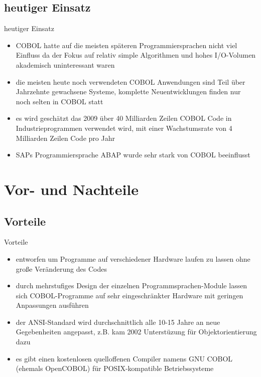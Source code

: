 \documentclass[handout]{beamer}
\begin{document}
\subsection{heutiger Einsatz}

\begin{frame}{heutiger Einsatz}
	\begin{itemize}
		\item
			COBOL hatte auf die meisten sp\"ateren Programmiersprachen nicht viel Einfluss da der Fokus auf relativ simple Algorithmen und hohes I/O-Volumen akademisch uninteressant waren
		\item
			die meisten heute noch verwendeten COBOL Anwendungen sind Teil \"uber Jahrzehnte gewachsene Systeme, komplette Neuentwicklungen finden nur noch selten in COBOL statt
		\item
			es wird gesch\"atzt das 2009 \"uber 40 Milliarden Zeilen COBOL Code in Industrieprogrammen verwendet wird, mit einer Wachstumsrate von 4 Milliarden Zeilen Code pro Jahr
		\item
			SAPs Programmiersprache ABAP wurde sehr stark von COBOL beeinflusst
	\end{itemize}
\end{frame}

\section{Vor- und Nachteile}

\subsection{Vorteile}

\begin{frame}{Vorteile}
	\begin{itemize}
		\item
			entworfen um Programme auf verschiedener Hardware laufen zu lassen ohne große Ver\"anderung des Codes
		\item
			durch mehrstufiges Design der einzelnen Programmsprachen-Module lassen sich COBOL-Programme auf sehr eingeschr\"ankter Hardware mit geringen Anpassungen ausf\"uhren
		\item
			der ANSI-Standard wird durchschnittlich alle 10-15 Jahre an neue Gegebenheiten angepasst, z.B. kam 2002 Unterstüzung für Objektorientierung dazu
		\item
			es gibt einen kostenlosen quelloffenen Compiler namens GNU COBOL (ehemals OpenCOBOL) für POSIX-kompatible Betriebssysteme
	\end{itemize}
\end{frame}
\end{document}
